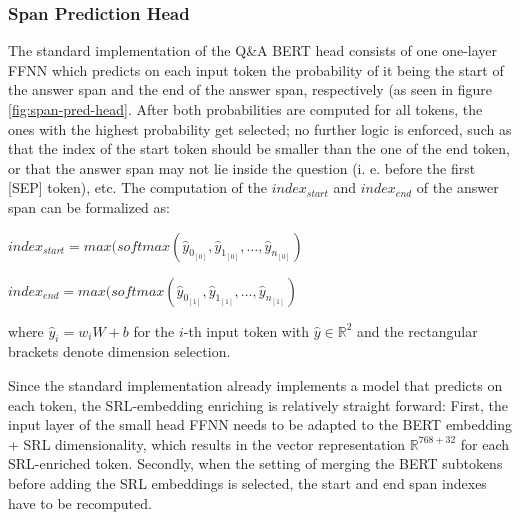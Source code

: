 
\subsubsection{Span Prediction Head}

The standard implementation of the Q\&A BERT head consists of one one-layer FFNN which predicts
on each input token the probability of it being the start of the answer span and the end of the
answer span, respectively (as seen in figure \ref{fig:span-pred-head}. After both probabilities are computed for all tokens, the ones with
the highest probability get selected; no further logic is enforced, such as that the index of
the start token should be smaller than the one of the end token, or that the answer span may
not lie inside the question (i. e. before the first [SEP] token), etc. The computation of the
$index_{start}$ and $index_{end}$ of the answer span can be formalized as:

$index_{start} = max(softmax(\hat{y}_{0_{[0]}}, \hat{y}_{1_{[0]}}, \dotso , \hat{y}_{n_{[0]}})$

$index_{end} = max(softmax(\hat{y}_{0_{[1]}}, \hat{y}_{1_{[1]}}, \dotso , \hat{y}_{n_{[1]}})$

where $\hat{y}_i = w_iW+b$ for the $i$-th input token with $\hat{y} \in \mathbb{R}^2$ and
the rectangular brackets denote dimension selection.

Since the standard implementation already implements a model that predicts on each token,
the SRL-embedding enriching is relatively straight forward:
First, the input layer of the small head FFNN needs to be adapted to the BERT embedding + SRL
dimensionality, which results in the vector representation $\mathbb{R}^{768+32}$ for each
SRL-enriched token. Secondly, when the setting of merging the BERT subtokens before adding
the SRL embeddings is selected, the start and end span indexes have to be recomputed.


